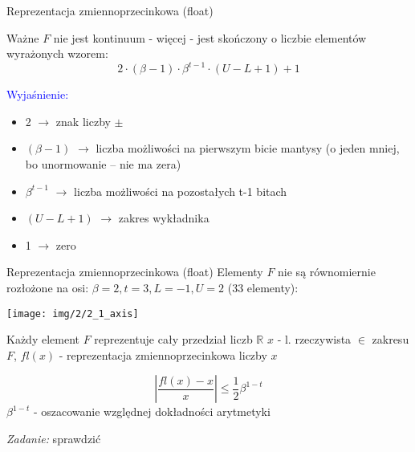\begin{frame}{Reprezentacja zmiennoprzecinkowa (float)}
    \begin{block}{Ważne}
    $F$ nie jest kontinuum - więcej - jest skończony o liczbie elementów wyrażonych wzorem:
    \[
    2 \cdot \left(\beta - 1 \right) \cdot \beta^{t-1} \cdot \left( U - L + 1 \right) + 1
    \]
    \begin{flushright}
    \end{flushright}
    \end{block}
    \textcolor{blue}{Wyjaśnienie:}
    \begin{itemize}
    	\item 2 $\rightarrow$ znak liczby $\pm$
    	\item  $(\beta - 1)$ $\rightarrow$ liczba możliwości na pierwszym bicie mantysy  (o jeden mniej, bo unormowanie -- nie ma zera)
    	\item $\beta^{t-1}$ $\rightarrow$ liczba możliwości na pozostałych  t-1 bitach 
    	\item $(U - L + 1)$ $\rightarrow$ zakres wykładnika
    	\item 1 $\rightarrow$ zero
    \end{itemize}
    
\end{frame}
\begin{frame}{Reprezentacja zmiennoprzecinkowa (float)}
    Elementy $F$ nie są równomiernie rozłożone na osi:
    $\beta = 2, t = 3, L = -1, U = 2$ \hspace{5mm} (33 elementy):
    \begin{center}
    \texttt{[image: img/2/2\_1\_axis]}
    \end{center}

    Każdy element $F$ reprezentuje cały przedział liczb $\mathbb{R}$\newline 
    $x$ - l. rzeczywista $\in$ zakresu $F$,\newline
    $fl(x)$ - reprezentacja zmiennoprzecinkowa liczby $x$
    
    \[
    \left| \frac{fl(x) - x}{x} \right| \le \frac{1}{2} \beta^{1-t}
    \]
  $\beta^{1-t}$ - oszacowanie względnej dokładności arytmetyki
    \begin{flushright}
        {\it Zadanie:} sprawdzić
    \end{flushright}
\end{frame}
